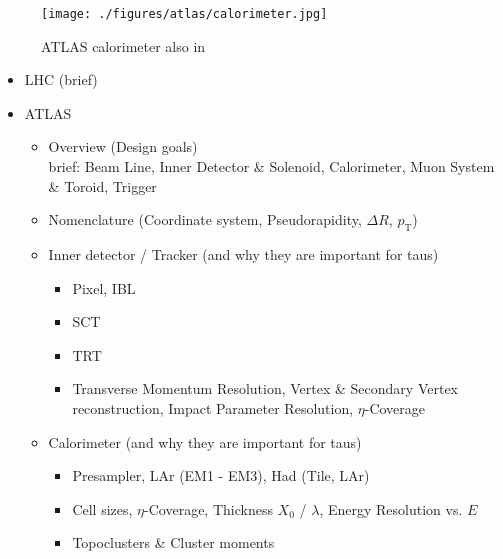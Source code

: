 

\begin{figure}[ht]
  \centering
  \texttt{[image: ./figures/atlas/calorimeter.jpg]}
  \caption{ATLAS calorimeter\cite{calo_fig} also in \cite{atlas_detector}}
  \label{fig:atlas_indet}
\end{figure}



\begin{itemize}
\item LHC (brief)

\item ATLAS
  \begin{itemize}
  \item Overview (Design goals) \\
    brief: Beam Line, Inner Detector \& Solenoid, Calorimeter, Muon System \&
    Toroid, Trigger

  \item Nomenclature (Coordinate system, Pseudorapidity, $\Delta R$,
    $p_\mathrm{T}$)

  \item Inner detector / Tracker (and why they are important for taus)
    \begin{itemize}
    \item Pixel, IBL
    \item SCT
    \item TRT
    \item  Transverse Momentum Resolution, Vertex \& Secondary Vertex
      reconstruction, Impact Parameter Resolution, $\eta$-Coverage
    \end{itemize}

  \item Calorimeter (and why they are important for taus)
    \begin{itemize}
    \item Presampler, LAr (EM1 - EM3), Had (Tile, LAr)
    \item Cell sizes, $\eta$-Coverage, Thickness $X_0$ / $\lambda$,
      Energy Resolution vs. $E$
    \item Topoclusters \& Cluster moments
    \end{itemize}

  \end{itemize}
\end{itemize}

